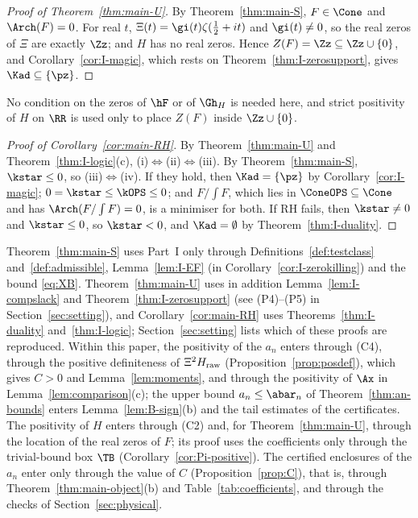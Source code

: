 \begin{proof}[Proof of Theorem~\textup{\ref{thm:main-U}}]
By Theorem~\ref{thm:main-S}, $F\in\Cone$ and $\Arch(F)=0$. For real $t$, $\Xi(t)=\gi(t)\zeta(\frac12+it)$ and $\gi(t)\ne0$, so the real zeros of
$\Xi$ are exactly $\Zz$; and $H$ has no real zeros. Hence $Z(F)=\Zz\subseteq\Zz\cup\{0\}$, and Corollary~\ref{cor:I-magic}, which rests
on Theorem~\ref{thm:I-zerosupport}, gives $\Kad\subseteq\{\pz\}$.
\end{proof}

No condition on the zeros of $\hF$ or of $\Gh_H$ is needed here, and strict positivity of $H$ on $\RR$ is used only to place $Z(F)$ inside
$\Zz\cup\{0\}$.

\begin{proof}[Proof of Corollary~\textup{\ref{cor:main-RH}}]
By Theorem~\ref{thm:main-U} and Theorem~\ref{thm:I-logic}(c), (i)$\Leftrightarrow$(ii)$\Leftrightarrow$(iii). By Theorem~\ref{thm:main-S},
$\kstar\le0$, so (iii)$\Leftrightarrow$(iv). If they hold, then $\Kad=\{\pz\}$ by Corollary~\ref{cor:I-magic}; $0=\kstar\le\kOPS\le0$; and $F/\int F$,
which lies in $\ConeOPS\subseteq\Cone$ and has $\Arch(F/\int F)=0$, is a minimiser for both. If RH fails, then $\kstar\ne0$ and $\kstar\le0$, so
$\kstar<0$, and $\Kad=\emptyset$ by Theorem~\ref{thm:I-duality}.
\end{proof}

\begin{remark}\label{rem:inputs}
Theorem~\ref{thm:main-S} uses Part~I only through Definitions~\ref{def:testclass} and~\ref{def:admissible}, Lemma~\ref{lem:I-EF} (in
Corollary~\ref{cor:I-zerokilling}) and the bound \eqref{eq:XB}. Theorem~\ref{thm:main-U} uses in addition Lemma~\ref{lem:I-compslack} and
Theorem~\ref{thm:I-zerosupport} (see (P4)--(P5) in Section~\ref{sec:setting}), and
Corollary~\ref{cor:main-RH} uses Theorems~\ref{thm:I-duality} and~\ref{thm:I-logic}; Section~\ref{sec:setting} lists which of these proofs are
reproduced. Within this paper, the
positivity of the $a_n$ enters through (C4), through the positive definiteness of $\Xi^2H_{\rm raw}$ (Proposition~\ref{prop:posdef}), which gives
$C>0$ and Lemma~\ref{lem:moments}, and through the positivity of $\Ax$ in Lemma~\ref{lem:comparison}(c); the upper bound $a_n\le\abar_n$ of
Theorem~\ref{thm:an-bounds} enters Lemma~\ref{lem:B-sign}(b) and the tail estimates of the certificates. The positivity of $H$ enters through
(C2) and, for Theorem~\ref{thm:main-U}, through the location of the real zeros of $F$; its proof uses the coefficients only through the
trivial-bound box $\TB$ (Corollary~\ref{cor:Pi-positive}). The certified enclosures of the $a_n$ enter only through the value of $C$
(Proposition~\ref{prop:C}), that is, through Theorem~\ref{thm:main-object}(b) and Table~\ref{tab:coefficients}, and through the checks of
Section~\ref{sec:physical}.
\end{remark}

